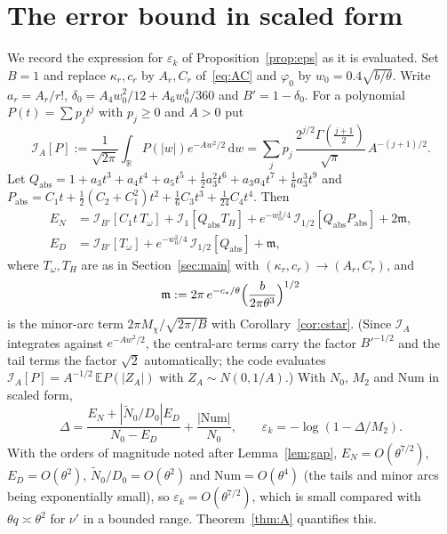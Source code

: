 \documentclass[11pt]{amsart}
\theoremstyle{definition}
\theoremstyle{remark}
\numberwithin{equation}{section}
\newcommand{\RR}{\mathbb{R}}
\newcommand{\E}{\mathbb{E}}
\newcommand{\dd}{\,\mathrm{d}}
\begin{document}
\appendix
\section{The error bound in scaled form}\label{app:eps}

We record the expression for $\varepsilon_k$ of Proposition~\ref{prop:eps} as it is evaluated. Set $B=1$ and replace $\kappa_r,c_r$ by
$A_r,C_r$ of~\eqref{eq:AC} and $\varphi_0$ by $w_0=0.4\sqrt{b/\theta}$. Write $a_r=A_r/r!$, $\delta_0=A_4w_0^2/12+A_6w_0^4/360$ and
$B'=1-\delta_0$. For a polynomial $P(t)=\sum p_jt^j$ with $p_j\ge0$ and $A>0$ put
\[
  \mathcal I_A[P]:=\frac1{\sqrt{2\pi}}\int_\RR P(|w|)e^{-Aw^2/2}\dd w=\sum_jp_j\,\frac{2^{j/2}\Gamma(\frac{j+1}2)}{\sqrt\pi}\,A^{-(j+1)/2}.
\]
Let $Q_{\mathrm{abs}}=1+a_3t^3+a_4t^4+a_5t^5+\frac12a_3^2t^6+a_3a_4t^7+\frac16a_3^3t^9$ and
$P_{\mathrm{abs}}=C_1t+\frac12(C_2+C_1^2)t^2+\frac16C_3t^3+\frac1{24}C_4t^4$. Then
\[
\begin{aligned}
E_N&=\mathcal I_{B'}[C_1t\,T_\omega]+\mathcal I_1[Q_{\mathrm{abs}}T_H]+e^{-w_0^2/4}\,\mathcal I_{1/2}[Q_{\mathrm{abs}}P_{\mathrm{abs}}]+2\mathfrak m,\\
E_D&=\mathcal I_{B'}[T_\omega]+e^{-w_0^2/4}\,\mathcal I_{1/2}[Q_{\mathrm{abs}}]+\mathfrak m,
\end{aligned}
\]
where $T_\omega,T_H$ are as in Section~\ref{sec:main} with $(\kappa_r,c_r)\to(A_r,C_r)$, and
\[
  \mathfrak m:=2\pi\,e^{-c_\ast/\theta}\Bigl(\frac{b}{2\pi\theta^3}\Bigr)^{1/2}
\]
is the minor-arc term $2\pi M_\chi/\sqrt{2\pi/B}$ with Corollary~\ref{cor:cstar}. (Since $\mathcal I_A$ integrates against $e^{-Aw^2/2}$, the central-arc terms carry the factor $B'^{-1/2}$ and the tail terms the
factor $\sqrt2$ automatically; the code evaluates $\mathcal I_A[P]=A^{-1/2}\,\E P(|Z_A|)$ with $Z_A\sim N(0,1/A)$.) With $N_0$, $M_2$ and
$\mathrm{Num}$ in scaled form,
\[
  \Delta=\frac{E_N+|\tilde N_0/D_0|E_D}{N_0-E_D}+\frac{|\mathrm{Num}|}{N_0},\qquad \varepsilon_k=-\log(1-\Delta/M_2).
\]
With the orders of magnitude noted after Lemma~\ref{lem:gap}, $E_N=O(\theta^{7/2})$, $E_D=O(\theta^2)$, $\tilde N_0/D_0=O(\theta^2)$ and
$\mathrm{Num}=O(\theta^4)$ (the tails and minor arcs being exponentially small), so $\varepsilon_k=O(\theta^{7/2})$, which is small compared
with $\theta q\asymp\theta^2$ for $\nu'$ in a bounded range. Theorem~\ref{thm:A} quantifies this.

\end{document}
